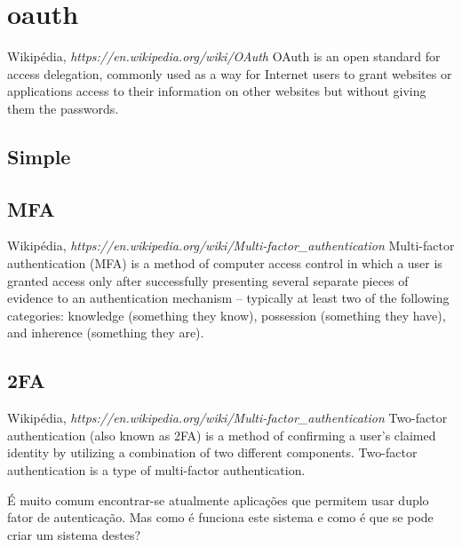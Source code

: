 \section{oauth}
\begin{chapquote}{Wikipédia, \textit{https://en.wikipedia.org/wiki/OAuth}}
OAuth is an open standard for access delegation, commonly used as a way for Internet users to grant websites or applications access to their information on other websites but without giving them the passwords.
\end{chapquote}

\subsection{Simple}

\subsection{MFA}
\begin{chapquote}{Wikipédia, \textit{https://en.wikipedia.org/wiki/Multi-factor\_authentication}}
Multi-factor authentication (MFA) is a method of computer access control in which a user is granted access only after successfully presenting several separate pieces of evidence to an authentication mechanism – typically at least two of the following categories: knowledge (something they know), possession (something they have), and inherence (something they are).
\end{chapquote}

\subsection{2FA}
\begin{chapquote}{Wikipédia, \textit{https://en.wikipedia.org/wiki/Multi-factor\_authentication}}
Two-factor authentication (also known as 2FA) is a method of confirming a user's claimed identity by utilizing a combination of two different components. Two-factor authentication is a type of multi-factor authentication.
\end{chapquote}
É muito comum encontrar-se atualmente aplicações que permitem usar duplo fator de autenticação. Mas como é funciona este sistema e como é que se pode criar um sistema destes?
